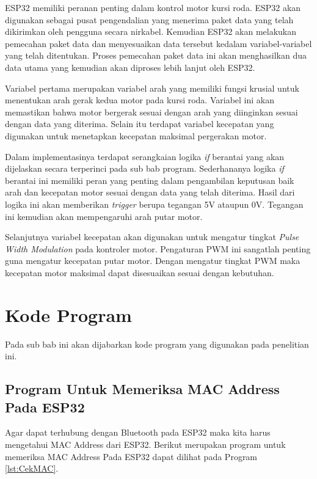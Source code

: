 ESP32 memiliki peranan penting dalam kontrol motor kursi roda. ESP32 akan digunakan sebagai pusat pengendalian yang menerima paket data yang telah dikirimkan oleh pengguna secara nirkabel. Kemudian ESP32 akan melakukan pemecahan paket data dan menyesuaikan data tersebut kedalam variabel-variabel yang telah ditentukan. Proses pemecahan paket data ini akan menghasilkan dua data utama yang kemudian akan diproses lebih lanjut oleh ESP32.

Variabel pertama merupakan variabel arah yang memiliki fungsi krusial untuk menentukan arah gerak kedua motor pada kursi roda. Variabel ini akan memastikan bahwa motor bergerak sesuai dengan arah yang diinginkan sesuai dengan data yang diterima. Selain itu terdapat variabel kecepatan yang digunakan untuk menetapkan kecepatan maksimal pergerakan motor.

Dalam implementasinya terdapat serangkaian logika \emph{if} berantai yang akan dijelaskan secara terperinci pada sub bab program. Sederhananya logika \emph{if} berantai ini memiliki peran yang penting dalam pengambilan keputusan baik arah dan kecepatan motor sesuai dengan data yang telah diterima. Hasil dari logika ini akan memberikan \emph{trigger} berupa tegangan 5V ataupun 0V. Tegangan ini kemudian akan mempengaruhi arah putar motor.

Selanjutnya variabel kecepatan akan digunakan untuk mengatur tingkat \emph{Pulse Width Modulation} pada kontroler motor. Pengaturan PWM ini sangatlah penting guna mengatur kecepatan putar motor. Dengan mengatur tingkat PWM maka kecepatan motor maksimal dapat disesuaikan sesuai dengan kebutuhan.


\section{Kode Program}
Pada sub bab ini akan dijabarkan kode program yang digunakan pada penelitian ini.

\subsection{Program Untuk Memeriksa MAC Address Pada ESP32}
Agar dapat terhubung dengan Bluetooth pada ESP32 maka kita harus mengetahui MAC Address dari ESP32. Berikut merupakan program untuk memeriksa MAC Address Pada ESP32 dapat dilihat pada Program \ref{lst:CekMAC}.


